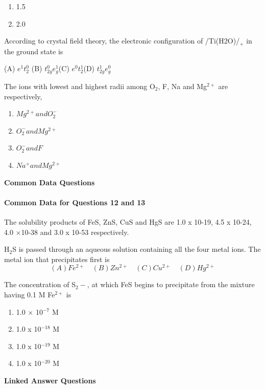 \documentclass[journal]{IEEEtran}
\begin{document}
\begin{enumerate}
{\begin{enumerate}
\item{ 1.5}

\item{ 2.0}
	\end{enumerate}


\item {According to crystal field theory, the electronic configuration of /Ti(H2O)/$_+$ in the ground state is}


(A) $e^1t^0_2$ \hspace{10mm} (B) $t^0_{2g}e_g^1$\hspace{10mm}(C) $e^0t^1_2$\hspace{10mm}(D) $t^1_{2g}e^0_g $

\item {The ions with lowest and highest radii among O$_2$, F, Na and Mg$^{2+}$ are respectively,}


		\begin{enumerate}
			\item{ $Mg^{2+} and O_2^-$}
			\item{ $O_2^- and Mg^{2+}$}
			\item{ $O_2^- and F$}
			\item{ $Na^+ and Mg^{2+}$}

		\end{enumerate}
\textbf{Common Data Questions}
\newline
\paragraph{Common Data for Questions 12 and 13}

The solubility products of FeS, ZnS, CuS and HgS are 1.0 x 10-19, 4.5 x 10-24, 4.0 ×10-38 and 3.0 x 10-53 respectively.

\item {H$_2$S is passed through an aqueous solution containing all the four metal ions. The metal ion that precipitates first is}
	\[(A) Fe^{2+} \quad (B) Zn^{2+} \quad(C) Cu^{2+} \quad(D) Hg^{2+}\]}
\item {The concentration of S$_2-$, at which FeS begins to precipitate from the mixture having 0.1 M Fe$^{2+}$ is}
	\begin{enumerate}
\item{ 1.0 × 10$^{-7}$ M}

\item{ 1.0 x 10$^{-18}$ M}

\item{ 1.0 x 10$^{-19}$ M}

\item{ 1.0 x 10$^{-20}$ M}
	\end{enumerate}
\textbf{Linked Answer Questions}


\end{enumerate}
\end{document}
